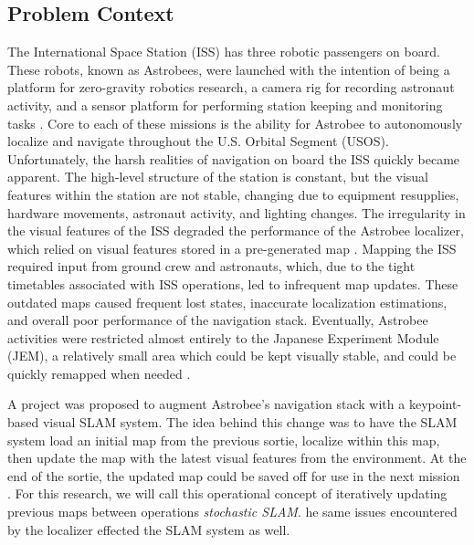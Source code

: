 \subsection{Problem Context}


The International Space Station (ISS) has three robotic passengers on board. These robots, known as Astrobees, were launched with the intention of being a platform for zero-gravity robotics research, a camera rig for recording astronaut activity, and a sensor platform for performing station keeping and monitoring tasks \cite{smithASTROBEENEWPLATFORM}. Core to each of these missions is the ability for Astrobee to autonomously localize and navigate throughout the U.S. Orbital Segment (USOS). Unfortunately, the harsh realities of navigation on board the ISS quickly became apparent. The high-level structure of the station is constant, but the visual features within the station are not stable, changing due to equipment resupplies, hardware movements, astronaut activity, and lighting changes. The irregularity in the visual features of the ISS degraded the performance of the Astrobee localizer, which relied on visual features stored in a pre-generated map \cite{soussanAstroLocEfficientRobust2022}. Mapping the ISS required input from ground crew and astronauts, which, due to the tight timetables associated with ISS operations, led to infrequent map updates. These outdated maps caused frequent lost states, inaccurate localization estimations, and overall poor performance of the navigation stack. Eventually, Astrobee activities were restricted almost entirely to the Japanese Experiment Module (JEM), a relatively small area which could be kept visually stable, and could be quickly remapped when needed \cite{carlinoLessonsLearnedAstrobee}.

A project was proposed to augment Astrobee's navigation stack with a keypoint-based visual SLAM system. The idea behind this change was to have the SLAM system load an initial map from the previous sortie, localize within this map, then update the map with the latest visual features from the environment. At the end of the sortie, the updated map could be saved off for use in the next mission \cite{zuralesCollaborativeSensingMapping2024}. For this research, we will call this operational concept of iteratively updating previous maps between operations \textit{stochastic SLAM}. he same issues encountered by the localizer effected the SLAM system as well. 

